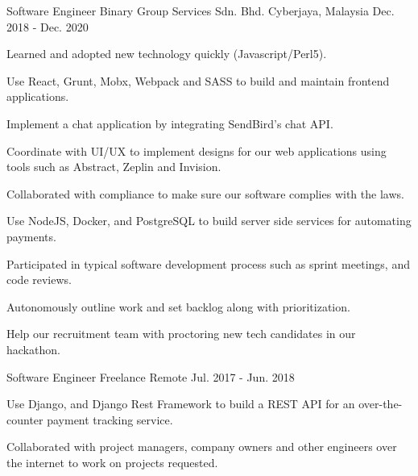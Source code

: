 

\begin{cventries}

  \cventry
    {Software Engineer} %
    {Binary Group Services Sdn. Bhd.} %
    {Cyberjaya, Malaysia} %
    {Dec. 2018 - Dec. 2020} %
    {
      \begin{cvitems} %
        \item {Learned and adopted new technology quickly (Javascript/Perl5).}
        \item {Use React, Grunt, Mobx, Webpack and SASS to build and maintain frontend applications.}
        \item {Implement a chat application by integrating SendBird's chat API.}
        \item {Coordinate with UI/UX to implement designs for our web applications using tools such as Abstract, Zeplin and Invision.}
        \item {Collaborated with compliance to make sure our software complies with the laws.}
        \item {Use NodeJS, Docker, and PostgreSQL to build server side services for automating payments.}
        \item {Participated in typical software development process such as sprint meetings, and code reviews.}
        \item {Autonomously outline work and set backlog along with prioritization.}
        \item {Help our recruitment team with proctoring new tech candidates in our hackathon.}
      \end{cvitems}
    }

  \cventry
    {Software Engineer} %
    {Freelance} %
    {Remote} %
    {Jul. 2017 - Jun. 2018} %
    {
      \begin{cvitems} %
        \item {Use Django, and Django Rest Framework to build a REST API for an over-the-counter payment tracking service.}
        \item {Collaborated with project managers, company owners and other engineers over the internet to work on projects requested.}
      \end{cvitems}
    }
\end{cventries}
